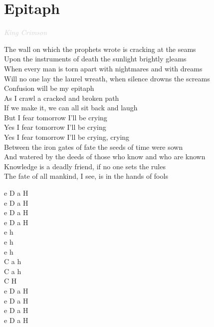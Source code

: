 \documentclass[a5paper, 10pt]{book}
\begin{document}
\section{Epitaph}\textcolor{lightgray}{\textit{King Crimson}}\vspace*{2mm}\\
\begin{minipage}[t]{0.83\textwidth}
  The wall on which the prophets wrote is cracking at the seams\\
  Upon the instruments of death the sunlight brightly gleams\\
  When every man is torn apart with nightmares and with dreams\\
  Will no one lay the laurel wreath, when silence drowns the screams\\

  \hspace*{5mm}Confusion will be my epitaph\\
  \hspace*{5mm}As I crawl a cracked and broken path\\
  \hspace*{5mm}If we make it, we can all sit back and laugh\\
  \hspace*{5mm}But I fear tomorrow I'll be crying\\
  \hspace*{5mm}Yes I fear tomorrow I'll be crying\\
  \hspace*{5mm}Yes I fear tomorrow I'll be crying, crying\\

  Between the iron gates of fate the seeds of time were sown\\
  And watered by the deeds of those who know and who are known\\
  Knowledge is a deadly friend, if no one sets the rules\\
  The fate of all mankind, I see, is in the hands of fools\\
\end{minipage}
\begin{minipage}[t]{0.17\textwidth}
  e D a H\\
  e D a H\\
  e D a H\\
  e D a H\\

  e h\\
  e h\\
  e h\\
  C a h\\
  C a h\\
  C H\\

  e D a H\\
  e D a H\\
  e D a H\\
  e D a H\\
\end{minipage}
\end{document}
